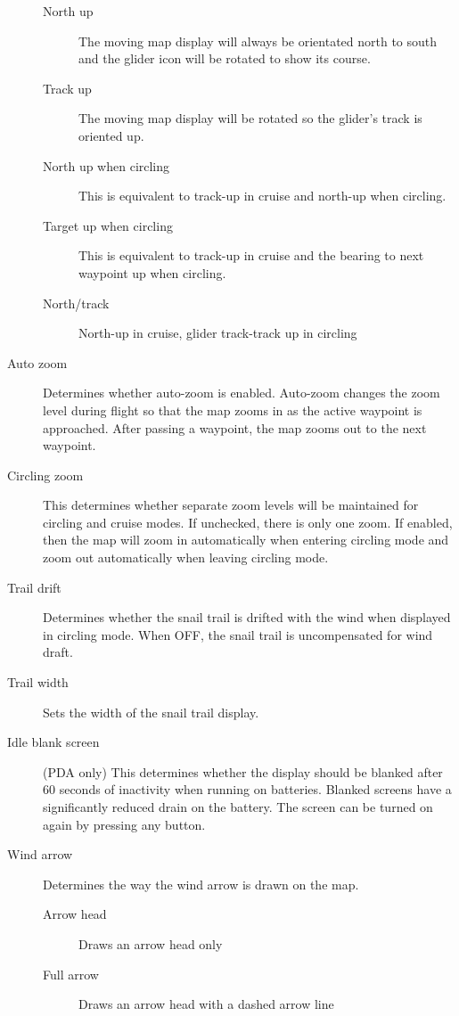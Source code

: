 \documentclass[a4paper,12pt]{refrep}
\begin{document}
\begin{description}
\begin{description}
\item[North up] The moving map display will always be orientated north to south and the glider icon will be rotated to show its course.
\item[Track up] The moving map display will be rotated so the glider's track
 is oriented up.
\item[North up when circling] This is equivalent to track-up in cruise and north-up when circling.
\item[Target up when circling] This is equivalent to track-up in cruise and the bearing to next waypoint up when circling.
\item[North/track] North-up in cruise, glider track-track up in circling
\end{description}
\item[Auto zoom] Determines whether auto-zoom is enabled.  Auto-zoom changes
the zoom level during flight so that the map zooms in as the active waypoint
is approached.  After passing a waypoint, the map zooms out to the next waypoint.  
\item[Circling zoom]  This determines whether separate zoom levels
will be maintained for circling and cruise modes.  If unchecked, there
is only one zoom.  If enabled, then the map will zoom in automatically
when entering circling mode and zoom out automatically when leaving
circling mode.
\item[Trail drift] Determines whether the snail trail is drifted with the wind when displayed in circling mode.  When OFF, the snail trail is uncompensated for wind draft.
\item[Trail width] Sets the width of the snail trail display.
\item[Idle blank screen] (PDA only)
This determines whether the display should be blanked after 60 seconds
of inactivity when running on batteries.  Blanked screens have a
significantly reduced drain on the battery.  The screen can be turned
on again by pressing any button.
\item[Wind arrow]  Determines the way the wind arrow is drawn on the map.
\begin{description}
\item[Arrow head] Draws an arrow head only
\item[Full arrow] Draws an arrow head with a dashed arrow line
\end{description}
\end{description}

\end{document}
